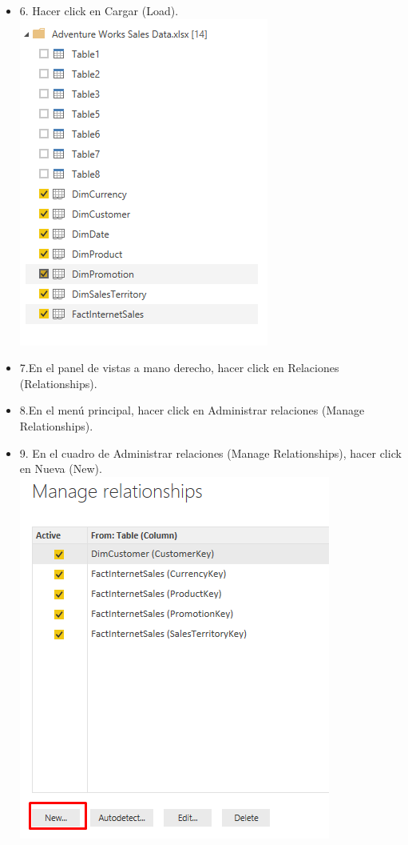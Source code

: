 \begin{itemize}
\item 6. Hacer click en Cargar (Load). \\
\includegraphics[scale=0.5]{./Imagenes/image002}
\item 7.En el panel de vistas a mano derecho, hacer click en Relaciones (Relationships).
\item 8.En el menú principal, hacer click en Administrar relaciones (Manage Relationships).
\item 9. En el cuadro de Administrar relaciones (Manage Relationships), hacer click en Nueva (New). \\
\includegraphics[scale=0.5]{./Imagenes/image003}

\end{itemize}
